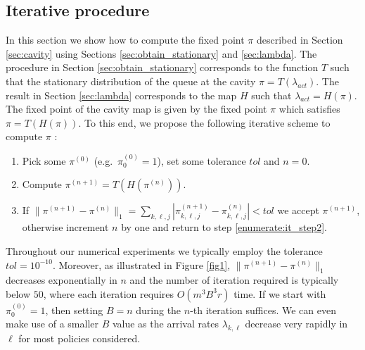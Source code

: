 \documentclass[12pt]{report}
\begin{document}
\subsection{Iterative procedure}\label{sec:iterative}
In this section we show how to compute the fixed point $\pi$ described in Section \ref{sec:cavity}  using Sections \ref{sec:obtain_stationary} and \ref{sec:lambda}. 
The procedure in Section \ref{sec:obtain_stationary} corresponds to the function $T$ such that the stationary distribution of the queue at the cavity $\pi = T(\lambda_{act})$. The 
result in Section \ref{sec:lambda} corresponds to the map $H$ such that $\lambda_{act} = H(\pi)$. The fixed point of the cavity map is given by the fixed point $\pi$ which satisfies $\pi = T(H(\pi))$. To this end, we propose the following iterative scheme to compute $\pi$ :
\begin{enumerate}
\item Pick some $\pi^{(0)}$ (e.g.~$\pi^{(0)}_0=1$), set some tolerance $tol$ and $n=0$.
\item Compute $\pi^{(n+1)}=T(H(\pi^{(n)}))$. \label{enumerate:it_step2}
\item If $\|\pi^{(n+1)} - \pi^{(n)}\|_1 = \sum_{k,\ell,j} | \pi^{(n+1)}_{k,\ell,j} - \pi^{(n)}_{k,\ell,j}| < tol$ we accept $\pi^{(n+1)}$, otherwise increment $n$ by one and return to step \ref{enumerate:it_step2}.
\end{enumerate}


Throughout our numerical experiments we typically employ the tolerance $tol=10^{-10}$. Moreover, as illustrated in Figure \ref{fig1}, $\|\pi^{(n+1)} - \pi^{(n)}\|_1$ decreases exponentially in $n$ and the number of iteration required is typically below $50$, where each iteration
requires $O(m^3B^3r)$ time. If we start with $\pi^{(0)}_0=1$, then setting $B=n$ during the
$n$-th iteration suffices. We can even make use of a smaller $B$ value as the arrival
rates $\lambda_{k,\ell}$ decrease very rapidly in $\ell$ for most policies considered.
\end{document}
